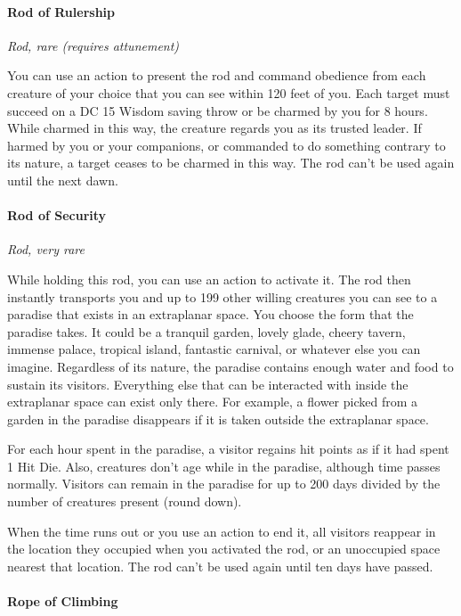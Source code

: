 \documentclass[
]{article}
\begin{document}
\hypertarget{rod-of-rulership}{%
\paragraph{Rod of Rulership}\label{rod-of-rulership}}

\emph{Rod, rare (requires attunement)}

You can use an action to present the rod and command obedience from each
creature of your choice that you can see within 120 feet of you. Each
target must succeed on a DC 15 Wisdom saving throw or be charmed by you
for 8 hours. While charmed in this way, the creature regards you as its
trusted leader. If harmed by you or your companions, or commanded to do
something contrary to its nature, a target ceases to be charmed in this
way. The rod can't be used again until the next dawn.

\hypertarget{rod-of-security}{%
\paragraph{Rod of Security}\label{rod-of-security}}

\emph{Rod, very rare}

While holding this rod, you can use an action to activate it. The rod
then instantly transports you and up to 199 other willing creatures you
can see to a paradise that exists in an extraplanar space. You choose
the form that the paradise takes. It could be a tranquil garden, lovely
glade, cheery tavern, immense palace, tropical island, fantastic
carnival, or whatever else you can imagine. Regardless of its nature,
the paradise contains enough water and food to sustain its visitors.
Everything else that can be interacted with inside the extraplanar space
can exist only there. For example, a flower picked from a garden in the
paradise disappears if it is taken outside the extraplanar space.

For each hour spent in the paradise, a visitor regains hit points as if
it had spent 1 Hit Die. Also, creatures don't age while in the paradise,
although time passes normally. Visitors can remain in the paradise for
up to 200 days divided by the number of creatures present (round down).

When the time runs out or you use an action to end it, all visitors
reappear in the location they occupied when you activated the rod, or an
unoccupied space nearest that location. The rod can't be used again
until ten days have passed.

\hypertarget{rope-of-climbing}{%
\paragraph{Rope of Climbing}\label{rope-of-climbing}}
\end{document}
